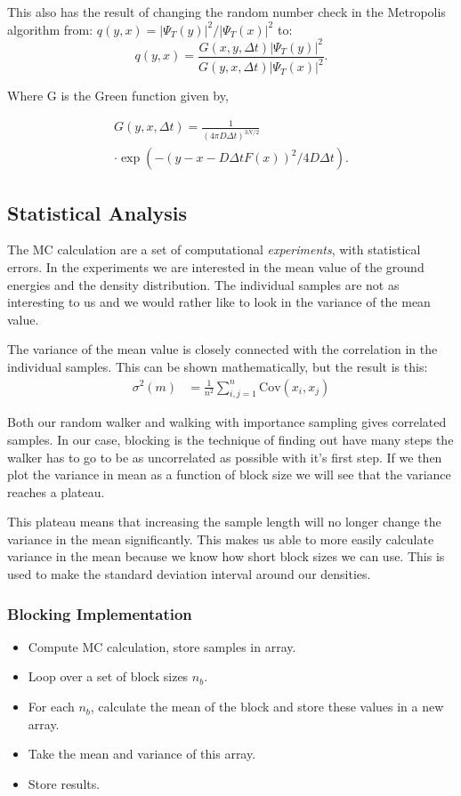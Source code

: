 \documentclass[twocolumns, a4paper,11pt,fleqn]{extarticle}
\newcommand{\eq}[1]{{\small\begin{align*}#1\end{align*}}}
\begin{document}
This also has the result of changing the random number check in the 
Metropolis algorithm from:
$q(y,x) = |\Psi_T(y)|^2/|\Psi_T(x)|^2$ to: 
\[
q(y,x) = \frac{G(x,y,\Delta t)|\Psi_T(y)|^2}{G(y,x,\Delta t)|\Psi_T(x)|^2}.
\]

Where G is the Green function given by,

\eq{
  G(y,x,\Delta t) =  \frac{1}{(4\pi D\Delta t)^{3N/2}}\\ \cdot \exp{\left(-(y-x-D\Delta t F(x))^2/4D\Delta t\right)}.
}

\subsection{Statistical Analysis}
The MC calculation are a set of computational \textit{experiments}, 
with statistical errors. In the experiments we are interested in the mean
value of the ground energies and the density distribution. The 
individual samples are not as interesting to us and we would rather like
to look in the variance of the mean value. 

	The variance of the mean value is closely connected with the correlation
in the individual samples. This can be shown mathematically, but the result
is this:
\eq{
\sigma^2(m) &= \frac{1}{n^2}\sum_{i,j=1}^{n} \mathrm{Cov}(x_i,x_j)
}

Both our random walker and walking with importance sampling gives correlated
samples. In our case, blocking is the technique of finding out have many steps
the walker has to go to be as uncorrelated as possible with it's first step.
If we then plot the variance in mean as a function of block size we 
will see that the variance reaches a plateau. 

This plateau means that increasing the sample length will no longer
change the variance in the mean significantly. This makes us able to more easily calculate 
variance in the mean because we know how short block sizes we can use. 
This is used to make the standard deviation interval around our densities. 


\subsubsection{Blocking Implementation}

\begin{itemize}
    \item Compute MC calculation, store samples in array.
    \item Loop over a set of block sizes $n_b$.
    \item For each $n_b$, calculate the mean of the block
        and store these values in a new array.
    \item Take the mean and variance of this array.
    \item Store results.
\end{itemize}
\end{document}
